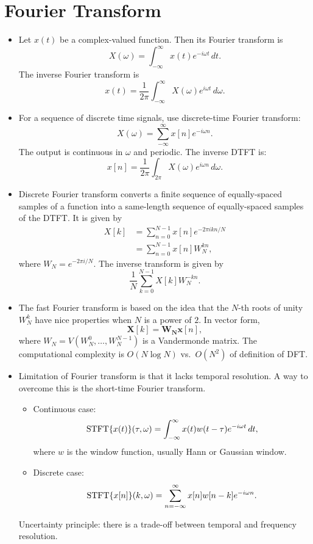 \chapter{Fourier Transform}
\begin{itemize}
\item 
Let $x(t)$ be a complex-valued function. Then its Fourier transform is 
\[ X(\omega) = \int_{-\infty}^\infty x(t)e^{-i\omega t}\,dt. \]
The inverse Fourier transform is
\[ x(t) = \frac{1}{2\pi} \int_{-\infty}^\infty X(\omega)e^{i\omega t}\,d\omega. \]

\item 
For a sequence of discrete time signals, use discrete-time Fourier transform:
\[ X(\omega) = \sum_{-\infty}^\infty x[n]e^{-i\omega n}. \]
The output is continuous in $\omega$ and periodic. The inverse DTFT is:
\[ x[n] = \frac{1}{2\pi} \int_{2\pi} X(\omega)e^{i\omega n}\,d\omega. \]

\item
Discrete Fourier transform converts a finite sequence of equally-spaced samples of a function into a same-length sequence of equally-spaced samples of the DTFT. It is given by
\begin{align*} X[k] &= \sum_{n=0}^{N-1} x[n]e^{-2\pi i kn/N} \\&= \sum_{n=0}^{N-1} x[n]W_N^{kn},
\end{align*}
where $W_N = e^{-2\pi i/N}.$
The inverse transform is given by 
\[ \frac{1}{N} \sum_{k=0}^{N-1} X[k]W^{-kn}_N.\]

\item 
The fast Fourier transform is based on the idea that the $N$-th roots of unity $W_N^k$ have nice properties when $N$ is a power of $2.$ In vector form,
\[ \mathbf{X}[k] = \mathbf{W_N}\mathbf{x}[n], \]
where $W_N = V(W_N^0,\ldots,W_N^{N-1})$ is a Vandermonde matrix. The computational complexity is $O(N\log{N})$ vs.\ $O(N^2)$ of definition of DFT.

\item 
Limitation of Fourier transform is that it lacks temporal resolution. A way to overcome this is the short-time Fourier transform.
	\begin{itemize}
	\item 
	Continuous case:
	\[ \operatorname{STFT}\{x(t)\}(\tau, \omega) = \int_{-\infty}^{\infty} x(t)w(t - \tau)e^{-i\omega t}\,dt, \] where $w$ is the window function, usually Hann or Gaussian window.
	
	\item 
	Discrete case:
	\[ \operatorname{STFT}\{x[n]\}(k, \omega) = \sum_{n=-\infty}^{\infty} x[n]w[n-k]e^{-i\omega n}. \]
	\end{itemize}
Uncertainty principle: there is a trade-off between temporal and frequency resolution.


\end{itemize}

